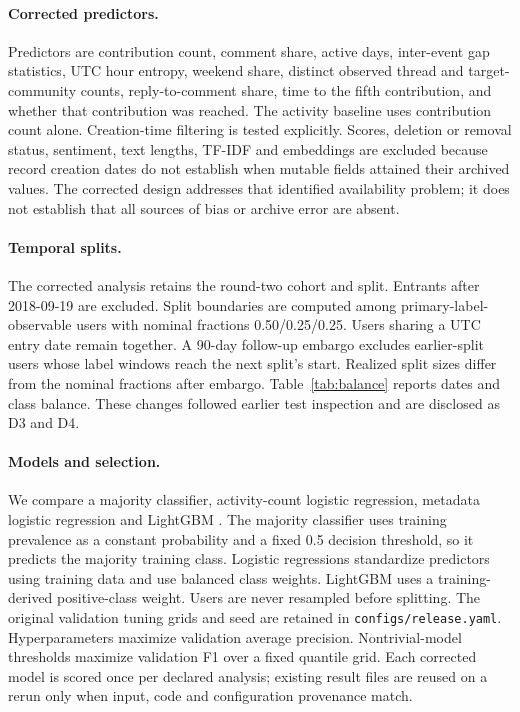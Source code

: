\documentclass[10pt,twocolumn]{article}
\begin{document}
\paragraph{Corrected predictors.} Predictors are contribution count, comment share, active days, inter-event gap statistics, UTC hour entropy, weekend share, distinct observed thread and target-community counts, reply-to-comment share, time to the fifth contribution, and whether that contribution was reached. The activity baseline uses contribution count alone. Creation-time filtering is tested explicitly. Scores, deletion or removal status, sentiment, text lengths, TF-IDF and embeddings are excluded because record creation dates do not establish when mutable fields attained their archived values. The corrected design addresses that identified availability problem; it does not establish that all sources of bias or archive error are absent.

\paragraph{Temporal splits.} The corrected analysis retains the round-two cohort and split. Entrants after 2018-09-19 are excluded. Split boundaries are computed among primary-label-observable users with nominal fractions 0.50/0.25/0.25. Users sharing a UTC entry date remain together. A 90-day follow-up embargo excludes earlier-split users whose label windows reach the next split's start. Realized split sizes differ from the nominal fractions after embargo. Table~\ref{tab:balance} reports dates and class balance. These changes followed earlier test inspection and are disclosed as D3 and D4.

\paragraph{Models and selection.} We compare a majority classifier, activity-count logistic regression, metadata logistic regression and LightGBM \cite{ke2017}. The majority classifier uses training prevalence as a constant probability and a fixed 0.5 decision threshold, so it predicts the majority training class. Logistic regressions standardize predictors using training data and use balanced class weights. LightGBM uses a training-derived positive-class weight. Users are never resampled before splitting. The original validation tuning grids and seed are retained in \texttt{configs/release.yaml}. Hyperparameters maximize validation average precision. Nontrivial-model thresholds maximize validation F1 over a fixed quantile grid. Each corrected model is scored once per declared analysis; existing result files are reused on a rerun only when input, code and configuration provenance match.
\end{document}
